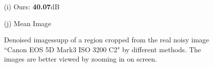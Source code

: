 \documentclass[10pt,onecolumn,letterpaper]{article}
\begin{document}
\begin{figure}[H]
{\begin{minipage}[t]{0.195\textwidth}
{\footnotesize (i) Ours: \textbf{40.07}dB  }
\end{minipage}
\begin{minipage}[t]{0.195\textwidth}
\centering
{}
{\footnotesize (j) Mean Image \cite{crosschannel2016} }
\end{minipage}
}
\caption{Denoised imagessupp of a region cropped from the real noisy image ``Canon EOS 5D Mark3 ISO 3200 C2" \cite{crosschannel2016} by different methods. The images are better viewed by zooming in on screen.} 
\label{fig10}
\end{figure}
\end{document}
